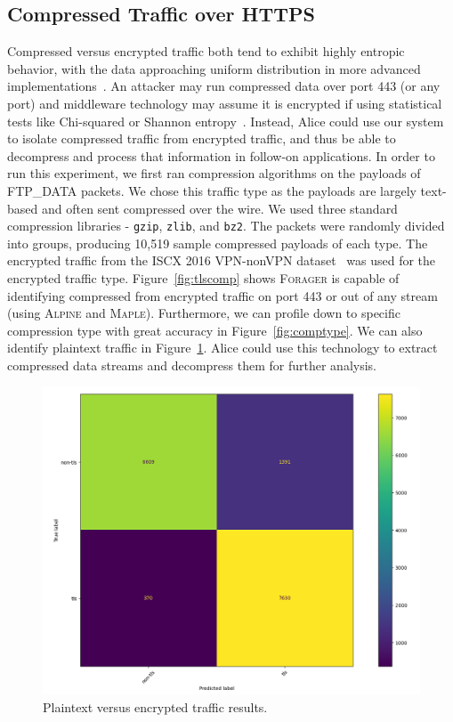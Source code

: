 \subsection{Compressed Traffic over HTTPS}
Compressed versus encrypted traffic both tend to exhibit highly entropic behavior, with the data approaching uniform distribution in more advanced implementations~\cite{hedge}. An attacker may run compressed data over port 443 (or any port) and middleware technology may assume it is encrypted if using statistical tests like Chi-squared or Shannon entropy~\cite{gaspari2020encod}. Instead, Alice could use our system to isolate compressed traffic from encrypted traffic, and thus be able to decompress and process that information in follow-on applications. In order to run this experiment, we first ran compression algorithms on the payloads of FTP\_DATA packets. We chose this traffic type as the payloads are largely text-based and often sent compressed over the wire. We used three standard compression libraries - \texttt{gzip}, \texttt{zlib}, and \texttt{bz2}. The packets were randomly divided into groups, producing 10,519 sample compressed payloads of each type. The encrypted traffic from the ISCX 2016 VPN-nonVPN dataset~\cite{iscx-vpn-paper} was used for the encrypted traffic type. Figure~\ref{fig:tlscomp} shows \textsc{Forager} is capable of identifying compressed from encrypted traffic on port 443 or out of any stream (using \textsc{Alpine} and \textsc{Maple}). Furthermore, we can profile down to specific compression type with great accuracy in Figure~\ref{fig:comptype}. We can also identify plaintext traffic in Figure~\ref{fig:tlsnontls}. Alice could use this technology to extract compressed data streams and decompress them for further analysis.

\begin{figure} [ht!]
\centering
\includegraphics[scale=0.4]{chapters/7/img/tls_nontls.png}
\caption{Plaintext versus encrypted traffic results.}
\label{fig:tlsnontls}
\end{figure}

